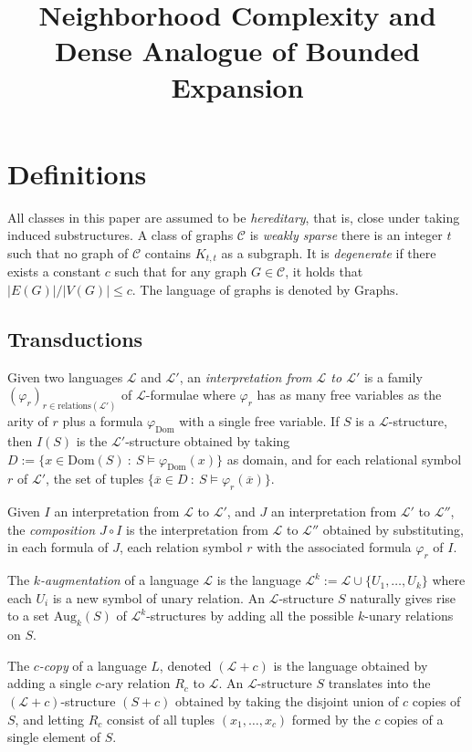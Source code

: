 \documentclass[11pt]{article}
\theoremstyle{definition}
\newcommand{\CC}{{\mathscr C}}
\renewcommand{\le}{\leqslant}
\newcommand{\Ll}{\mathcal L}
\newcommand{\Dom}{\text{Dom}}
\newcommand{\remph}[1]{{\color{red} \emph{#1}}}
\newcommand{\Aug}{\text{Aug}}
\newcommand{\Graphs}{\mathrm{Graphs}}
\begin{document}
\title{Neighborhood Complexity and Dense Analogue of Bounded Expansion}
\date{}
\maketitle

\section{Definitions}
All classes in this paper are assumed to be \remph{hereditary}, that is, close under taking induced substructures.
A class of graphs $\CC$ is \remph{weakly sparse} there is an integer $t$ such that no graph of $\CC$ contains $K_{t, t}$ as a subgraph. It is \remph{degenerate} if there exists a constant $c$ such that for any graph $G \in \CC$, it holds that $|E(G)|/|V(G)| \le c$.
The language of graphs is denoted by \remph{$\Graphs$}.

\subsection{Transductions}
Given two languages $\Ll$ and $\Ll'$,
an \remph{interpretation from $\Ll$ to $\Ll'$} is
a family $(\varphi_r)_{r \in \text{relations}(\Ll')}$ of $\Ll$-formulae where $\varphi_r$ has as many free variables as the arity of $r$ plus a formula $\varphi_{\Dom}$ with a single free variable.
If $S$ is a $\Ll$-structure, then \remph{$I(S)$} is the $\Ll'$-structure obtained by taking $D := \{x \in \Dom(S)~:~S \models \varphi_{\Dom}(x)\}$ as domain, and for each relational symbol $r$ of $\Ll'$, the set of tuples
$\{\overline x \in D~:~S \models \varphi_r(\overline x)\}$. 

Given $I$ an interpretation from $\Ll$ to $\Ll'$,
and $J$ an interpretation from $\Ll'$ to $\Ll''$, the \remph{composition $J \circ I$} is the interpretation from $\Ll$ to $\Ll''$ obtained by substituting, in each formula of $J$, each relation symbol $r$ with the associated formula $\varphi_r$ of $I$.

The \remph{$k$-augmentation} of a language $\Ll$ is the language
$\Ll^k := \Ll \cup \{U_1, \dots, U_k\}$ where each $U_i$ is a new symbol of unary relation.
An $\Ll$-structure $S$ naturally gives rise to a set \remph{$\Aug_k(S)$} of $\Ll^k$-structures by adding all the possible $k$-unary relations on $S$.

The \remph{$c$-copy} of a language $L$, denoted $(\Ll + c)$ is the language obtained by adding a single $c$-ary relation $R_c$ to $\Ll$.
An $\Ll$-structure $S$ translates into the $(\Ll + c)$-structure $(S + c)$ obtained by taking the disjoint union of $c$ copies of $S$, and letting $R_c$ consist of all tuples $(x_1, \ldots, x_c)$ formed by the $c$ copies of a single element of $S$.
\end{document}
